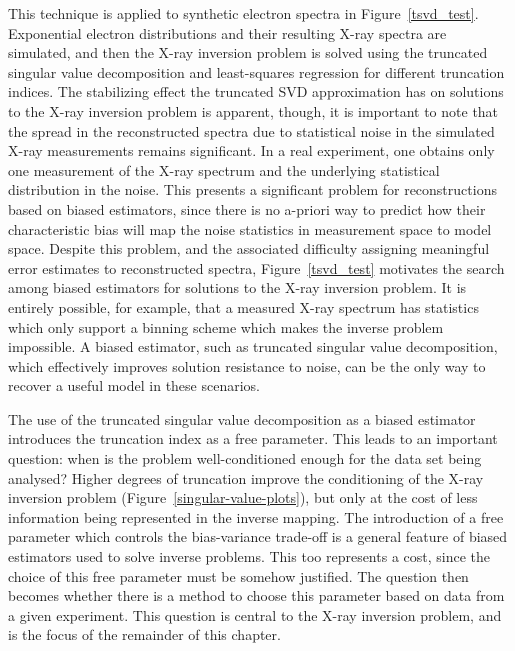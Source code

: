 This technique is applied to synthetic electron spectra in Figure~\ref{tsvd_test}. Exponential electron distributions and their resulting X-ray spectra are simulated, and then the X-ray inversion problem is solved using the truncated singular value decomposition and least-squares regression for different truncation indices. The stabilizing effect the truncated SVD approximation has on solutions to the X-ray inversion problem is apparent, though, it is important to note that the spread in the reconstructed spectra due to statistical noise in the simulated X-ray measurements remains significant. In a real experiment, one obtains only one measurement of the X-ray spectrum and the underlying statistical distribution in the noise. This presents a significant problem for reconstructions based on biased estimators, since there is no a-priori way to predict how their characteristic bias will map the noise statistics in measurement space to model space. Despite this problem, and the associated difficulty assigning meaningful error estimates to reconstructed spectra, Figure~\ref{tsvd_test} motivates the search among biased estimators for solutions to the X-ray inversion problem. It is entirely possible, for example, that a measured X-ray spectrum has statistics which only support a binning scheme which makes the inverse problem impossible. A biased estimator, such as truncated singular value decomposition, which effectively improves solution resistance to noise, can be the only way to recover a useful model in these scenarios. 

The use of the truncated singular value decomposition as a biased estimator introduces the truncation index as a free parameter. This leads to an important question: when is the problem well-conditioned enough for the data set being analysed? Higher degrees of truncation improve the conditioning of the X-ray inversion problem (Figure~\ref{singular-value-plots}), but only at the cost of less information being represented in the inverse mapping. The introduction of a free parameter which controls the bias-variance trade-off is a general feature of biased estimators used to solve inverse problems. This too represents a cost, since the choice of this free parameter must be somehow justified. The question then becomes whether there is a method to choose this parameter based on data from a given experiment. This question is central to the X-ray inversion problem, and is the focus of the remainder of this chapter. 

